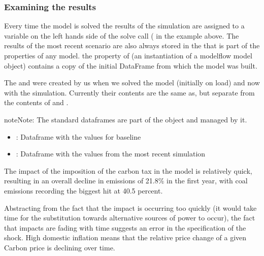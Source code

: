 \documentclass[letterpaper,10pt,english]{jupyterBook}
\begin{document}
\subsubsection{Examining the results}
\label{\detokenize{content/05_WBModels/MoreComplexScenarios:examining-the-results}}
\sphinxAtStartPar
Every time the model is solved the results of the simulation are assigned to a variable on the left hands side of the solve call ( in the example above.  The results of the most recent scenario are also always stored in the   that is part of the properties of any  model. the  property of  (an instantiation of a modelflow model object) contains a copy of the initial DataFrame from which the model was built.

\sphinxAtStartPar
The   and  were created by us when we solved the model (initially on load) and now with the simulation.  Currently their contents are the same as, but separate from the contents of  and .

\begin{sphinxadmonition}{note}{Note:}
\sphinxAtStartPar
The standard dataframes are part of the  object and managed by it.
\begin{itemize}
\item {} 
\sphinxAtStartPar
{}: Dataframe with the values for baseline

\item {} 
\sphinxAtStartPar
{}: Dataframe with the values from the most recent simulation

\end{itemize}
\end{sphinxadmonition}

\sphinxAtStartPar
The impact of the imposition of the carbon tax in the model is relatively quick, resulting in an overall decline in emissions of 21.8\% in the first year, with coal emissions recording the biggest hit at \sphinxhyphen{}40.5 percent.

\sphinxAtStartPar
Abstracting from the fact that the impact is occurring too quickly (it would take time for the substitution towards alternative sources of power to occur), the fact that impacts are fading with time suggests an error in the specification of the shock.  High domestic inflation means that the relative price change of a given Carbon price is declining over time.
\end{document}
